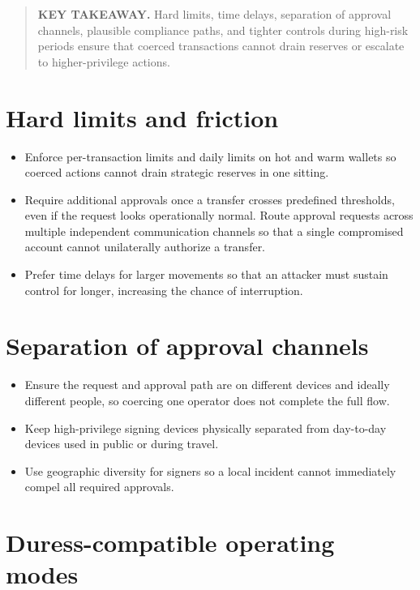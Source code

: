 \begin{quote}
\textbf{KEY TAKEAWAY.} Hard limits, time delays, separation of approval channels, plausible compliance paths, and tighter controls during high-risk periods ensure that coerced transactions cannot drain reserves or escalate to higher-privilege actions.
\end{quote}

\section{Hard limits and friction}\label{hard-limits-and-friction}

\begin{itemize}
\tightlist
\item
  Enforce per-transaction limits and daily limits on hot and warm wallets so coerced actions cannot drain strategic reserves in one sitting.
\item
  Require additional approvals once a transfer crosses predefined thresholds, even if the request looks operationally normal. Route approval requests across multiple independent communication channels so that a single compromised account cannot unilaterally authorize a transfer.
\item
  Prefer time delays for larger movements so that an attacker must sustain control for longer, increasing the chance of interruption.
\end{itemize}

\section{Separation of approval channels}\label{separation-of-approval-channels}

\begin{itemize}
\tightlist
\item
  Ensure the request and approval path are on different devices and ideally different people, so coercing one operator does not complete the full flow.
\item
  Keep high-privilege signing devices physically separated from day-to-day devices used in public or during travel.
\item
  Use geographic diversity for signers so a local incident cannot immediately compel all required approvals.
\end{itemize}

\section{Duress-compatible operating modes}\label{duress-compatible-operating-modes}

